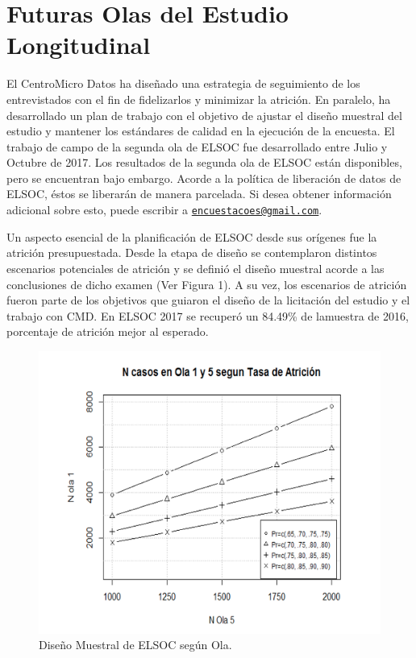 \documentclass[
]{book}
\begin{document}
\hypertarget{futuras-olas-del-estudio-longitudinal}{%
\section{Futuras Olas del Estudio Longitudinal}\label{futuras-olas-del-estudio-longitudinal}}

El CentroMicro Datos ha diseñado una estrategia de seguimiento de los entrevistados con el fin de fidelizarlos y minimizar la atrición. En paralelo, ha desarrollado un plan de trabajo con el objetivo de ajustar el diseño muestral del estudio y mantener los estándares de calidad en la ejecución de la encuesta. El trabajo de campo de la segunda ola de ELSOC fue desarrollado entre Julio y Octubre de 2017. Los resultados de la segunda ola de ELSOC están disponibles, pero se encuentran bajo embargo. Acorde a la política de liberación de datos de ELSOC, éstos se liberarán de manera parcelada. Si desea obtener información adicional sobre esto, puede escribir a \href{mailto:encuestacoes@gmail.com}{\nolinkurl{encuestacoes@gmail.com}}.

Un aspecto esencial de la planificación de ELSOC desde sus orígenes fue la atrición presupuestada. Desde la etapa de diseño se contemplaron distintos escenarios potenciales de atrición y se definió el diseño muestral acorde a las conclusiones de dicho examen (Ver Figura 1). A su vez, los escenarios de atrición fueron parte de los objetivos que guiaron el diseño de la licitación del estudio y el trabajo con CMD. En ELSOC 2017 se recuperó un 84.49\% de lamuestra de 2016, porcentaje de atrición mejor al esperado.

\begin{figure}

{\centering \includegraphics[width=0.75\linewidth,height=0.75\textheight]{imagenes/attrition_01} 

}

\caption{Diseño Muestral de ELSOC según Ola.}\label{fig:unnamed-chunk-9}
\end{figure}
\end{document}
